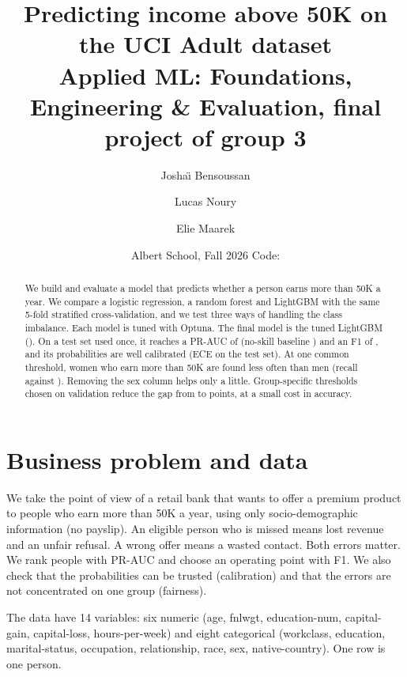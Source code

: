 \documentclass[11pt,a4paper]{article}
\title{\vspace{-1.2cm}Predicting income above 50K on the UCI Adult dataset\\[3pt]
\large Applied ML: Foundations, Engineering \& Evaluation, final project of group 3}
\author{Josha\"{\i} Bensoussan \and Lucas Noury \and Elie Maarek}
\date{Albert School, Fall 2026 \quad Code: \repo}
\begin{document}
\maketitle
\vspace{-0.8cm}
\begin{center}
\end{center}

\begin{abstract}
\noindent We build and evaluate a model that predicts whether a person earns more than 50K a year. We compare a logistic regression, a random forest and LightGBM with the same 5-fold stratified cross-validation, and we test three ways of handling the class imbalance. Each model is tuned with Optuna. The final model is the tuned LightGBM (\finalName). On a test set used once, it reaches a PR-AUC of \testPrAuc{} (no-skill baseline \prevalenceTest) and an F1 of \testFOne{}, and its probabilities are well calibrated (ECE \testEce{} on the test set). At one common threshold, women who earn more than 50K are found less often than men (recall \tprFemaleBefore{} against \tprMaleBefore). Removing the sex column helps only a little. Group-specific thresholds chosen on validation reduce the gap from \gapPointsBefore{} to \gapPointsAfter{} points, at a small cost in accuracy.
\end{abstract}

\section{Business problem and data}
We take the point of view of a retail bank that wants to offer a premium product to people who earn more than 50K a year, using only socio-demographic information (no payslip). An eligible person who is missed means lost revenue and an unfair refusal. A wrong offer means a wasted contact. Both errors matter. We rank people with PR-AUC and choose an operating point with F1. We also check that the probabilities can be trusted (calibration) and that the errors are not concentrated on one group (fairness).

The data have 14 variables: six numeric (age, fnlwgt, education-num, capital-gain, capital-loss, hours-per-week) and eight categorical (workclass, education, marital-status, occupation, relationship, race, sex, native-country). One row is one person.
\end{document}
